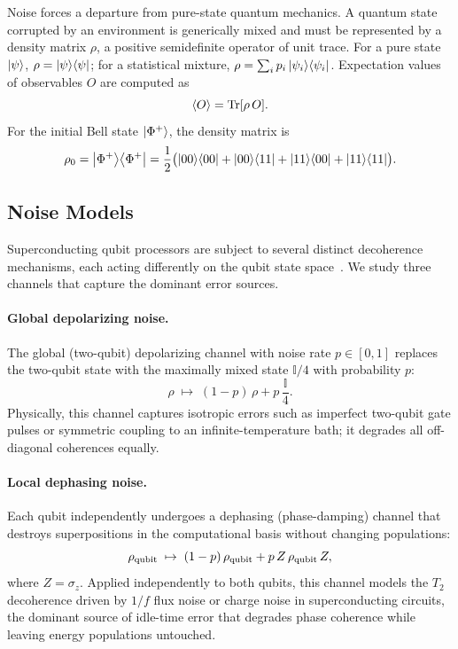 \documentclass[12pt]{article}
\newcommand{\Phiplus}{\ket{\Phi^+}}
\newcommand{\Id}{\mathbb{I}}
\begin{document}
Noise forces a departure from pure-state quantum mechanics.
A quantum state corrupted by an environment is generically mixed and must be represented by a
density matrix $\rho$, a positive semidefinite operator of unit trace.
For a pure state $\ket{\psi}$, $\rho = \ket{\psi}\!\bra{\psi}$; for a statistical mixture,
$\rho = \sum_i p_i \ket{\psi_i}\!\bra{\psi_i}$.
Expectation values of observables $O$ are computed as
\begin{equation}
  \langle O \rangle = \Tr[\rho\, O].
  \label{eq:expectation}
\end{equation}
For the initial Bell state $\Phiplus$, the density matrix is
\begin{equation}
  \rho_0 = \Phiplus\!\bra{\Phi^+}
         = \frac{1}{2}\bigl(\ket{00}\!\bra{00} + \ket{00}\!\bra{11} + \ket{11}\!\bra{00} + \ket{11}\!\bra{11}\bigr).
  \label{eq:rho_bell}
\end{equation}

\subsection{Noise Models}
\label{subsec:noise_models}

Superconducting qubit processors are subject to several distinct decoherence mechanisms, each
acting differently on the qubit state space~\cite{nielsen2000}.
We study three channels that capture the dominant error sources.

\paragraph{Global depolarizing noise.}
The global (two-qubit) depolarizing channel with noise rate $p \in [0,1]$ replaces the
two-qubit state with the maximally mixed state $\Id/4$ with probability $p$:
\begin{equation}
  \rho \;\mapsto\; (1-p)\,\rho + p\,\frac{\Id}{4}.
  \label{eq:depol_channel}
\end{equation}
Physically, this channel captures isotropic errors such as imperfect two-qubit gate pulses
or symmetric coupling to an infinite-temperature bath; it degrades all off-diagonal coherences
equally.

\paragraph{Local dephasing noise.}
Each qubit independently undergoes a dephasing (phase-damping) channel that destroys
superpositions in the computational basis without changing populations:
\begin{equation}
  \rho_{\rm qubit} \;\mapsto\; (1-p)\,\rho_{\rm qubit} + p\,Z\,\rho_{\rm qubit}\,Z,
  \label{eq:dephase_channel}
\end{equation}
where $Z = \sigma_z$.
Applied independently to both qubits, this channel models the $T_2$ decoherence driven by
$1/f$ flux noise or charge noise in superconducting circuits, the dominant source of idle-time
error that degrades phase coherence while leaving energy populations untouched.
\end{document}
